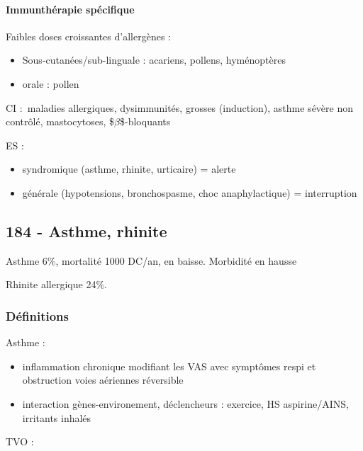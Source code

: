 \documentclass[11pt]{article}
\begin{document}
\paragraph{Immunthérapie spécifique}
\label{sec:org57bfe1d}
Faibles doses croissantes d'allergènes :

\begin{itemize}
\item Sous-cutanées/sub-linguale : acariens, pollens, hyménoptères
\item orale : pollen
\end{itemize}

CI : maladies allergiques, dysimmunités, grosses (induction), asthme sévère non
contrôlé, mastocytoses, \$\(\beta\)\$-bloquants

ES : 

\begin{itemize}
\item syndromique (asthme, rhinite, urticaire) = alerte
\item générale (hypotensions, bronchospasme, choc anaphylactique) =
interruption
\end{itemize}

\subsection{184 \textdagger{} - Asthme, rhinite}
\label{sec:orge35df74}
Asthme 6\%, mortalité 1000 DC/an, en baisse. Morbidité en hausse

Rhinite allergique 24\%.
\subsubsection{Définitions}
\label{sec:org3b58207}
Asthme : 

\begin{itemize}
\item inflammation chronique modifiant les VAS avec symptômes respi et obstruction voies aériennes réversible
\item interaction gènes-environement, déclencheurs : exercice, HS aspirine/AINS,
irritants inhalés
\end{itemize}


TVO : 

\end{document}
